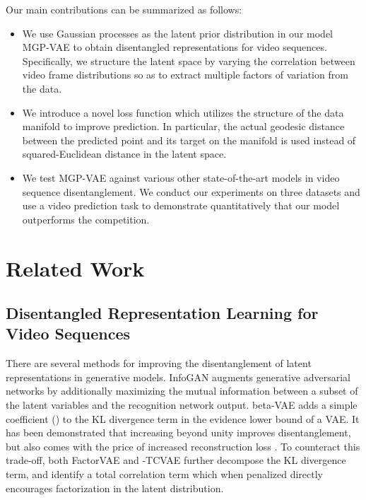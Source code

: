 \documentclass[runningheads]{llncs}
\begin{document}
   Our main contributions can be summarized as follows:
   \begin{itemize}
   \item We use Gaussian processes as the latent prior distribution in our model MGP-VAE to obtain disentangled representations for video sequences. Specifically, we structure the latent space by varying the correlation between video frame distributions so as to extract multiple factors of variation from the data. 
   \item We introduce a novel loss function which utilizes the structure of the data manifold to improve prediction. In particular, the actual geodesic distance between the predicted point and its target on the manifold is used instead of squared-Euclidean distance in the latent space.
   \item We test MGP-VAE against various other state-of-the-art models in video sequence disentanglement. We conduct our experiments on three datasets and use a video prediction task to demonstrate quantitatively that our model outperforms the competition.
   \end{itemize}
   
   \section{Related Work}
   
   \subsection{Disentangled Representation Learning for Video Sequences}
    There are several methods for improving the disentanglement of latent representations in generative models. InfoGAN \cite{infoGAN} augments generative adversarial networks \cite{GANs} by additionally maximizing the mutual information between a subset of the latent variables and the recognition network output. beta-VAE \cite{Higgins2017betaVAELB} adds a simple coefficient () to the KL divergence term in the evidence lower bound of a VAE. It has been demonstrated that increasing  beyond unity improves disentanglement, but also comes with the price of increased reconstruction loss  \cite{Kim2018DisentanglingBF}. To counteract this trade-off, both FactorVAE \cite{Kim2018DisentanglingBF} and -TCVAE \cite{tcVAE} further decompose the KL divergence term, and identify a total correlation term which when penalized directly encourages factorization in the latent distribution. \par 
\end{document}
